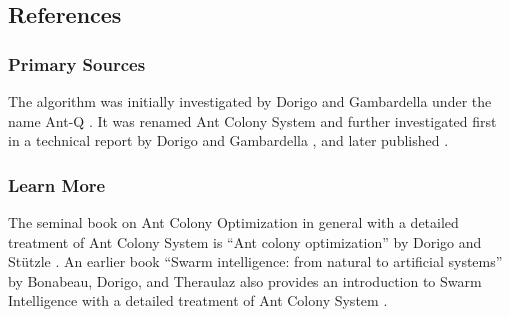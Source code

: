 

\subsection{References}

% 
% 
\subsubsection{Primary Sources}
The algorithm was initially investigated by Dorigo and Gambardella under the name Ant-Q \cite{Dorigo1996a, Gambardella1995}.
It was renamed Ant Colony System and further investigated first in a technical report by Dorigo and Gambardella \cite{Dorigo1997a}, and later published \cite{Dorigo1997}.

% 
% 
\subsubsection{Learn More}
The seminal book on Ant Colony Optimization in general with a detailed treatment of Ant Colony System is ``Ant colony optimization'' by Dorigo and St\"utzle \cite{Dorigo2004}. An earlier book ``Swarm intelligence: from natural to artificial systems'' by Bonabeau, Dorigo, and Theraulaz also provides an introduction to Swarm Intelligence with a detailed treatment of Ant Colony System \cite{Bonabeau1999}.


